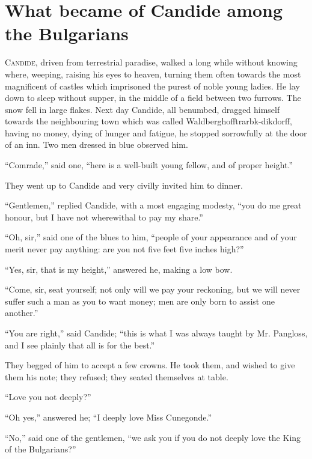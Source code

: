 \vspace{1cm}
\begingroup
\let\clearpage\relax
\chapter{What became of Candide among the Bulgarians}
\endgroup
\vspace{-1cm}
\lettrine[lraise=0.1,nindent=0em,slope=-.5em]{ C}{andide}, driven from terrestrial paradise, walked a long while without knowing where, weeping, raising his eyes to heaven, turning them often towards the most magnificent of castles which imprisoned the purest of noble young ladies. He lay down to sleep without supper, in the middle of a field between two furrows. The snow fell in large flakes. Next day Candide, all benumbed, dragged himself towards the neighbouring town which was called Waldberghofftrarbk-dikdorff, having no money, dying of hunger and fatigue, he stopped sorrowfully at the door of an inn. Two men dressed in blue observed him.

``Comrade,'' said one, ``here is a well-built young fellow, and of proper height.''

They went up to Candide and very civilly invited him to dinner.

``Gentlemen,'' replied Candide, with a most engaging modesty, ``you do me great honour, but I have not wherewithal to pay my share.''

``Oh, sir,'' said one of the blues to him, ``people of your appearance and of your merit never pay anything: are you not five feet five inches high?''

``Yes, sir, that is my height,'' answered he, making a low bow.

``Come, sir, seat yourself; not only will we pay your reckoning, but we will never suffer such a man as you to want money; men are only born to assist one another.''

``You are right,'' said Candide; ``this is what I was always taught by Mr. Pangloss, and I see plainly that all is for the best.''

They begged of him to accept a few crowns. He took them, and wished to give them his note; they refused; they seated themselves at table.

``Love you not deeply?''

``Oh yes,'' answered he; ``I deeply love Miss Cunegonde.''

``No,'' said one of the gentlemen, ``we ask you if you do not deeply love the King of the Bulgarians?''

